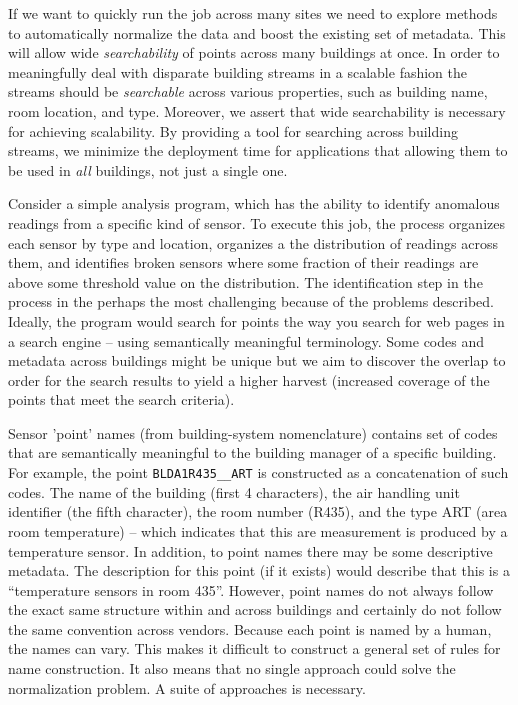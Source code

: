 If we want to quickly run the job across many sites we need
to explore methods to automatically normalize the data and boost the
existing set of metadata.  This will allow wide \emph{searchability} of points across
many buildings at once.
In order to meaningfully deal with disparate building streams in a scalable 
fashion the streams should be \emph{searchable} across various properties, such
as building name, room location, and type.  Moreover, we
assert that wide searchability is necessary for achieving scalability.  By providing a tool for
searching across building streams, we minimize the deployment time for applications that 
allowing them to be used in \emph{all} buildings, not just a single one.  

Consider a simple analysis program, which has the ability
to identify anomalous readings from a specific kind of sensor. To execute this job, 
the process organizes each sensor by type and location, organizes a the distribution of
readings across them, and identifies broken sensors where some fraction of
their readings are above some threshold value on the distribution.
The identification step in the process in the perhaps the most challenging 
because of the problems described.  Ideally, the program would search for points the
way you search for web pages in a search engine -- using semantically meaningful 
terminology. Some codes and metadata across buildings might be unique but we aim 
to discover the overlap to order for the search results to yield a higher harvest
(increased coverage of the points that meet the search criteria).

Sensor 'point' names (from building-system nomenclature) contains set of codes that are 
semantically meaningful to the building manager of a specific building.
For example, the point \texttt{BLDA1R435\_\_ART} is constructed as a concatenation of such codes.
The name of the building (first 4 characters), the air handling unit identifier (the 
fifth character), the room number (R435), and the type ART (area room temperature) -- which 
indicates that this are measurement is produced by a temperature sensor. In addition,
to point names there may be some descriptive metadata.  The description for this point (if it 
exists) would describe that this is a ``temperature sensors in room 435''.
However, point names do not always follow the exact same structure within and across
buildings and certainly do not follow the same convention across vendors.  
Because each point is named by a human, the names can vary. This makes it difficult to construct a general
set of rules for name construction.  It also means that no single approach could solve the normalization
problem.  A suite of approaches is necessary.

